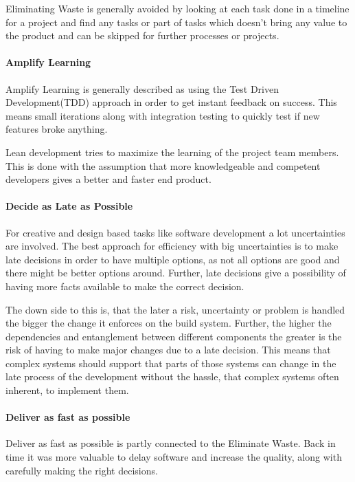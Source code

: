 \documentclass{sig-alternate}
\begin{document}
Eliminating Waste is generally avoided by looking at each task done in a timeline for a project
and find any tasks or part of tasks which doesn't bring any value to the product and can be 
skipped for further processes or projects.
 
\paragraph{Amplify Learning}
Amplify Learning is generally described as using the Test Driven Development(TDD) approach in order to 
get instant feedback on success.
This means small iterations along with integration testing to quickly test if new features broke anything.

Lean development tries to maximize the learning of the project team members. 
This is done with the assumption that more knowledgeable and competent developers gives a better and 
faster end product.

\paragraph{Decide as Late as Possible}
For creative and design based tasks like software development a lot uncertainties are involved. 
The best approach for efficiency with big uncertainties is to make late decisions in order to have multiple
options, as not all options are good and there might be better options around. Further, late decisions 
give a possibility of having more facts available to make the correct decision.

The down side to this is, that the later a risk, uncertainty or problem is handled the bigger the change it 
enforces on the build system. Further, the higher the dependencies and entanglement between different 
components the greater is the risk of having to make major changes due to a late decision. This means that 
complex systems should support that parts of those systems can change in the late process
of the development without the hassle, that complex systems often inherent, to implement them.

\paragraph{Deliver as fast as possible}
Deliver as fast as possible is partly connected to the Eliminate Waste. 
Back in time it was more valuable to delay software and increase the quality, along with carefully making 
the right decisions.
\end{document}

